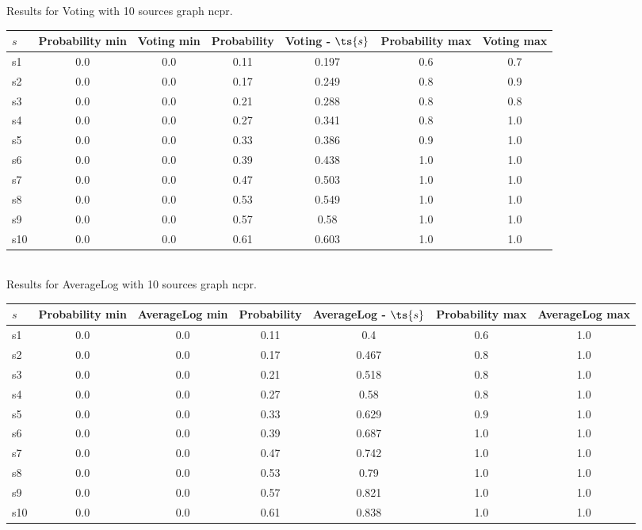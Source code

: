 \documentclass{article}
\begin{document}
\noindent Results for Voting with 10 sources graph ncpr.

\noindent\begin{tabular}{|l|c|c|c|c|c|c|}
\hline
$s$& Probability min & Voting min & Probability & Voting - $\ts{s}$ & Probability max & Voting max\\
\hline
s1 &0.0 & 0.0 & 0.11 & 0.197 & 0.6 & 0.7\\
\hline
s2 &0.0 & 0.0 & 0.17 & 0.249 & 0.8 & 0.9\\
\hline
s3 &0.0 & 0.0 & 0.21 & 0.288 & 0.8 & 0.8\\
\hline
s4 &0.0 & 0.0 & 0.27 & 0.341 & 0.8 & 1.0\\
\hline
s5 &0.0 & 0.0 & 0.33 & 0.386 & 0.9 & 1.0\\
\hline
s6 &0.0 & 0.0 & 0.39 & 0.438 & 1.0 & 1.0\\
\hline
s7 &0.0 & 0.0 & 0.47 & 0.503 & 1.0 & 1.0\\
\hline
s8 &0.0 & 0.0 & 0.53 & 0.549 & 1.0 & 1.0\\
\hline
s9 &0.0 & 0.0 & 0.57 & 0.58 & 1.0 & 1.0\\
\hline
s10 &0.0 & 0.0 & 0.61 & 0.603 & 1.0 & 1.0\\
\hline
\end{tabular}\\

\noindent Results for AverageLog with 10 sources graph ncpr.

\noindent\begin{tabular}{|l|c|c|c|c|c|c|}
\hline
$s$& Probability min & AverageLog min & Probability & AverageLog - $\ts{s}$ & Probability max & AverageLog max\\
\hline
s1 &0.0 & 0.0 & 0.11 & 0.4 & 0.6 & 1.0\\
\hline
s2 &0.0 & 0.0 & 0.17 & 0.467 & 0.8 & 1.0\\
\hline
s3 &0.0 & 0.0 & 0.21 & 0.518 & 0.8 & 1.0\\
\hline
s4 &0.0 & 0.0 & 0.27 & 0.58 & 0.8 & 1.0\\
\hline
s5 &0.0 & 0.0 & 0.33 & 0.629 & 0.9 & 1.0\\
\hline
s6 &0.0 & 0.0 & 0.39 & 0.687 & 1.0 & 1.0\\
\hline
s7 &0.0 & 0.0 & 0.47 & 0.742 & 1.0 & 1.0\\
\hline
s8 &0.0 & 0.0 & 0.53 & 0.79 & 1.0 & 1.0\\
\hline
s9 &0.0 & 0.0 & 0.57 & 0.821 & 1.0 & 1.0\\
\hline
s10 &0.0 & 0.0 & 0.61 & 0.838 & 1.0 & 1.0\\
\hline
\end{tabular}\\
\end{document}
